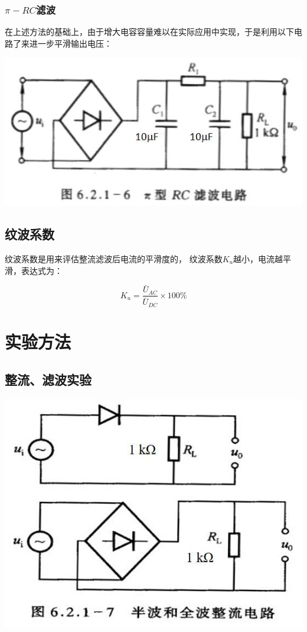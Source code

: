 \documentclass[a4paper]{ltxdoc}
\newenvironment{Figure}
{\par\medskip\noindent\minipage{\linewidth}}
{\endminipage\par\medskip}
\begin{document}
\begin{multicols}{2}
    \subsubsection{\texorpdfstring{$\pi-RC$} -滤波}

    在上述方法的基础上，由于增大电容容量难以在实际应用中实现，于是利用以下电路了来进一步平滑输出电压：

    \begin{Figure}
        \centering
        \includegraphics[width=0.7\linewidth]{img/4.png}
    \end{Figure}

    \subsection{纹波系数}

    纹波系数是用来评估整流滤波后电流的平滑度的， 纹波系数$K_u$越小，电流越平滑，表达式为：

    $$K_u = \dfrac{\bar U_{AC}}{\bar U_{DC}} \times 100 \%$$


    \section{实验方法}

    \subsection{整流、滤波实验}
    \begin{Figure}
        \centering
        \includegraphics[width=0.7\linewidth]{img/5.png}
    \end{Figure}


\end{multicols}
\end{document}

